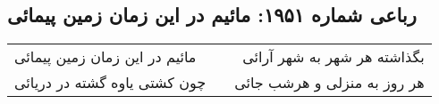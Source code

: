 \begin{center}
\section*{رباعی شماره ۱۹۵۱: مائیم در این زمان زمین پیمائی}
\label{sec:1951}
\begin{longtable}{l p{0.5cm} r}
مائیم در این زمان زمین پیمائی
&&
بگذاشته هر شهر به شهر آرائی
\\
چون کشتی یاوه گشته در دریائی
&&
هر روز به منزلی و هرشب جائی
\\
\end{longtable}
\end{center}
